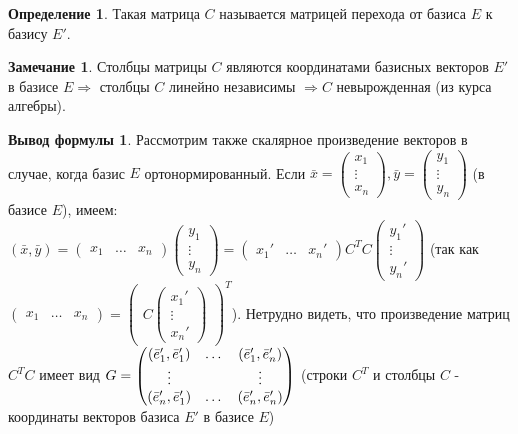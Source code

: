 \documentclass[a4paper, 12pt]{article}
\theoremstyle{definition}
\newtheorem*{definition}{Определение}
\newtheorem*{formula}{Вывод формулы}
\newtheorem*{remark}{Замечание}
\begin{document}
	\begin{definition}
		Такая матрица $C$ называется матрицей перехода от базиса $E$ к базису $E'$.
	\end{definition}
	\begin{remark}
		Столбцы матрицы $C$ являются координатами базисных векторов $E'$ в базисе $E \Rightarrow$ столбцы $C$ линейно независимы $\Rightarrow C$ невырожденная (из курса алгебры).
	\end{remark}
	\begin{formula}
		Рассмотрим также скалярное произведение векторов в случае, когда базис $E$ ортонормированный. Если $\bar{x} = \begin{pmatrix} x_{1} \\ \vdots \\ x_{n}  \end{pmatrix}, \bar{y} = \begin{pmatrix} y_{1} \\ \vdots \\ y_{n}  \end{pmatrix}$ (в базисе $E$), имеем: $(\bar{x}, \bar{y}) = \begin{pmatrix} x_{1}&\dots&x_{n} \end{pmatrix} \begin{pmatrix} y_{1} \\ \vdots \\ y_{n} \end{pmatrix} = \begin{pmatrix} x_{1}'&\dots&x_{n}' \end{pmatrix}C^{T}C\begin{pmatrix} y_{1}' \\ \vdots \\ y_{n}' \end{pmatrix}$ (так как $\begin{pmatrix} x_{1}&\dots&x_{n}\end{pmatrix} = \begin{pmatrix} C \begin{pmatrix} x_{1}' \\ \vdots \\x_{n}' \end{pmatrix}\end{pmatrix}^{T}$). Нетрудно видеть, что произведение матриц $C^{T}C$ имеет вид $G = \begin{pmatrix} (\bar{e}_{1}', \bar{e}_{1}')&\dots&(\bar{e}_{1}', \bar{e}_{n}') \\ \vdots&\null&\vdots \\ (\bar{e}_{n}', \bar{e}_{1}') & \dots & (\bar{e}_{n}', \bar{e}_{n}') \end{pmatrix}$ (строки $C^{T}$ и столбцы $C$ - координаты векторов базиса $E'$ в базисе $E$) \\

\end{formula}
\end{document}
